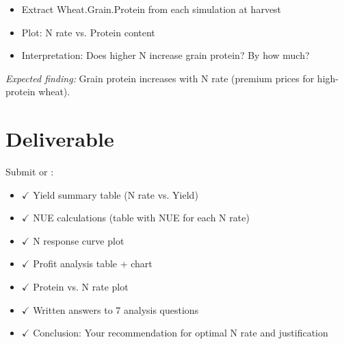 \begin{itemize}
  \item Extract Wheat.Grain.Protein from each simulation at harvest
  \item Plot: N rate vs. Protein content
  \item Interpretation: Does higher N increase grain protein? By how much?
\end{itemize}

\textit{Expected finding:} Grain protein increases with N rate (premium prices for high-protein wheat).

\section{Deliverable}

Submit  or :

\begin{itemize}
  \item $\checkmark$ Yield summary table (N rate vs. Yield)
  \item $\checkmark$ NUE calculations (table with NUE for each N rate)
  \item $\checkmark$ N response curve plot
  \item $\checkmark$ Profit analysis table + chart
  \item $\checkmark$ Protein vs. N rate plot
  \item $\checkmark$ Written answers to 7 analysis questions
  \item $\checkmark$ Conclusion: Your recommendation for optimal N rate and justification
\end{itemize}

